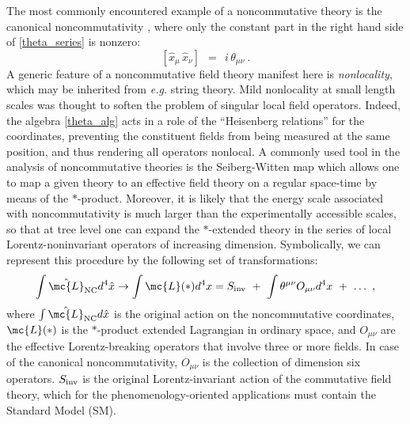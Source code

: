 \documentclass[prl,tightenlines]{revtex4}
\begin{document}
The most commonly encountered example of a noncommutative theory is the canonical noncommutativity \cite{Douglas:2001ba}, 
where only the constant part in the right hand side of \eqref{theta_series} is nonzero:
\begin{equation}
\label{theta_alg}
	[ \hat{x}_\mu \, \hat{x}_\nu ] ~~=~~ i\,\theta_{\mu\nu}~.
\end{equation}
A generic feature of a noncommutative field theory manifest here is 
{\it nonlocality}, which may be inherited  from
{\em e.g.} string theory.
Mild nonlocality at small length scales was thought to soften the problem of singular local field operators.
Indeed, the algebra \eqref{theta_alg} acts in a role of the ``Heisenberg relations'' for the coordinates,
preventing the constituent fields from being measured at the same position, 
and thus rendering all operators nonlocal. A commonly used tool in the analysis of 
noncommutative theories is the Seiberg-Witten map 
\cite{Seiberg:1999vs} which allows one to map a given theory to an 
effective field theory on a regular space-time 
by   means of the $*$-product. Moreover, it is likely that the energy scale associated 
with noncommutativity is much larger than the experimentally accessible 
scales, so that at tree level one can expand the $*$-extended theory 
in the series of local Lorentz-noninvariant
operators of increasing dimension. Symbolically, we can represent this procedure
by the following set of transformations:
\begin{equation}
\label{expansion-theta}
\int \hat{\mc{L}}_{\rm NC} d^4 \hat{x} \to \int \mc{L}(*) d^4 x = S_{\rm inv} ~+~ 
\int \theta^{\mu\nu}O_{\mu\nu} d^4x ~+~ \dots~,
\end{equation}
where $\int \hat{\mc{L}}_{\rm NC} d\hat{x} $ is the original action on the noncommutative coordinates,
$\mc{L}(*)$ is the $*$-product extended Lagrangian in ordinary space, and $O_{\mu\nu}$ are the 
effective Lorentz-breaking operators that involve three or more fields. In case of the canonical 
noncommutativity, $O_{\mu\nu}$ is the collection of dimension six operators. $S_{\rm inv}$ is the original 
Lorentz-invariant action of the commutative field theory, which for the phenomenology-oriented 
applications must contain the Standard Model (SM).
\end{document}
